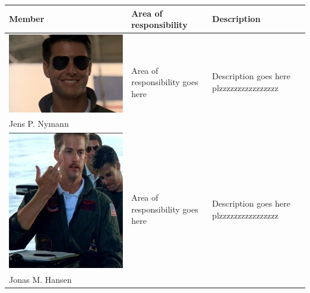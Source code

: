 \begin{tabular}[c]{|p{3cm}| p{5cm} | p{6cm}|}
	\hline
	\textbf{Member} & \textbf{Area of responsibility} & \textbf{Description}\\\hline
	
	\phantom{Test}
	\includegraphics[scale=0.54]{Introduction/TeamPictures/TomC} & \multirow{2}{5cm}{Area of responsibility goes here} & \multirow{2}{6cm}{Description goes here plzzzzzzzzzzzzzzzz} \\
	Jens P. Nymann & & \\ \hline
	
	\phantom{Test}
	\includegraphics[scale=0.27]{Introduction/TeamPictures/Goose} & \multirow{2}{5cm}{Area of responsibility goes here} & \multirow{2}{6cm}{Description goes here plzzzzzzzzzzzzzzzz} \\
	Jonas M. Hansen & & \\ \hline
	

\end{tabular}
